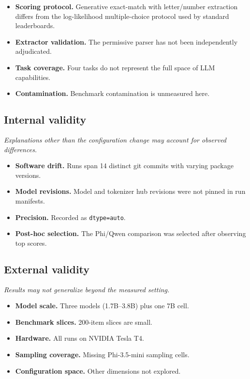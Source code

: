 \begin{itemize}
  \item \textbf{Scoring protocol.} Generative exact-match with letter/number
extraction differs from the log-likelihood multiple-choice protocol used by
standard leaderboards.
  \item \textbf{Extractor validation.} The permissive parser has not been
independently adjudicated.
  \item \textbf{Task coverage.} Four tasks do not represent the full
space of LLM capabilities.
  \item \textbf{Contamination.} Benchmark contamination is unmeasured here.
\end{itemize}

\subsection{Internal validity}
\textit{Explanations other than the configuration change may account for observed differences.}

\begin{itemize}
  \item \textbf{Software drift.} Runs span 14 distinct git commits with
varying package versions.
  \item \textbf{Model revisions.} Model and tokenizer hub revisions were
not pinned in run manifests.
  \item \textbf{Precision.} Recorded as \texttt{dtype=auto}.
  \item \textbf{Post-hoc selection.} The Phi/Qwen comparison was
selected after observing top scores.
\end{itemize}

\subsection{External validity}
\textit{Results may not generalize beyond the measured setting.}

\begin{itemize}
  \item \textbf{Model scale.} Three models (1.7B--3.8B) plus one 7B cell.
  \item \textbf{Benchmark slices.} 200-item slices are small.
  \item \textbf{Hardware.} All runs on NVIDIA Tesla T4.
  \item \textbf{Sampling coverage.} Missing Phi-3.5-mini sampling cells.
  \item \textbf{Configuration space.} Other dimensions not explored.
\end{itemize}

